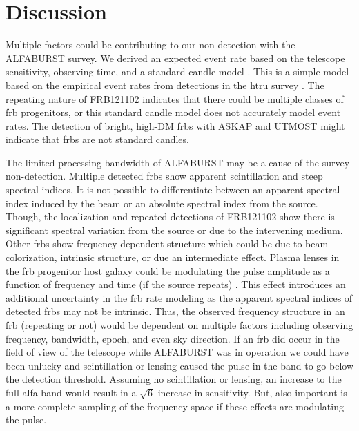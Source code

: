 \documentclass[a4paper,fleqn,usenatbib]{mnras}
\begin{document}
\section{Discussion}
\label{sec:discuss}

Multiple factors could be contributing to our non-detection with the ALFABURST
survey. We derived an expected event rate based on the telescope sensitivity,
observing time, and a standard candle model \citep{2013MNRAS.436L...5L}. This is
a simple model based on the empirical event rates from detections in the
\gls{htru} survey \citep{2013Sci...341...53T}. The repeating nature of
FRB121102 indicates that there could be multiple classes of \gls{frb}
progenitors, or this standard candle model does not accurately model event
rates. The detection of bright, high-DM \glspl{frb} with ASKAP
\citep{2017ApJ...841L..12B} and UTMOST \citep{2017MNRAS.468.3746C,atel10697}
might indicate that \glspl{frb} are not standard candles.

The limited processing bandwidth of ALFABURST may be a cause of the survey
non-detection. Multiple detected \glspl{frb} show apparent scintillation and
steep spectral indices. It is not possible to differentiate between an apparent
spectral index induced by the beam or an absolute spectral index from the
source. Though, the localization and repeated detections of FRB121102 show there
is significant spectral variation from the source or due to the intervening
medium. Other \glspl{frb} show frequency-dependent structure which could be due
to beam colorization, intrinsic structure, or due an intermediate effect. Plasma
lenses in the \gls{frb} progenitor host galaxy could be modulating the pulse
amplitude as a function of frequency and time (if the source repeats)
\citep{2017ApJ...842...35C}. This effect introduces an additional uncertainty in
the \gls{frb} rate modeling as the apparent spectral indices of detected
\glspl{frb} may not be intrinsic. Thus, the observed frequency structure in an
\gls{frb} (repeating or not) would be dependent on multiple factors including
observing frequency, bandwidth, epoch, and even sky direction. If an \gls{frb}
did occur in the field of view of the telescope while ALFABURST was in operation
we could have been unlucky and scintillation or lensing caused the pulse in the
band to go below the detection threshold. Assuming no scintillation or lensing,
an increase to the full \gls{alfa} band would result in a $\sqrt{6}$ increase in
sensitivity. But, also important is a more complete sampling of the frequency
space if these effects are modulating the pulse.
\end{document}
